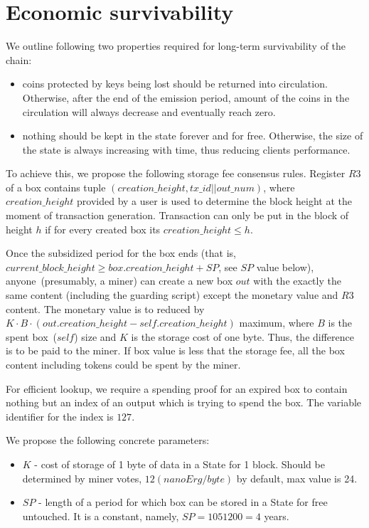\section{Economic survivability}

We outline following two properties required for long-term survivability of the chain:

\begin{itemize}
    \item{} coins protected by keys being lost should be returned into circulation.
    Otherwise, after the end of the emission period, amount of the coins
    in the circulation will always decrease and eventually reach zero.
    \item{} nothing should be kept in the state forever and for free.
    Otherwise, the size of the state is always increasing with time, thus reducing clients performance.
\end{itemize}

To achieve this, we propose the following storage fee consensus rules.
Register $R3$ of a box contains tuple $(creation\_height, tx\_id || out\_num)$, where $creation\_height$ provided by a user
is used to determine the block height at the moment of transaction generation.
Transaction can only be put in the block of height $h$ if for every created box its $creation\_height \le h$.

Once the subsidized period for the box ends (that is,
$current\_block\_height \ge box.creation\_height + SP$, see $SP$ value below), anyone~(presumably, a miner) can
create a new box $out$ with the exactly the same content (including the guarding
script) except the monetary value and $R3$ content. The monetary value is to
reduced by $K \cdot B \cdot (out.creation\_height - self.creation\_height)$ maximum, where $B$ is the spent box~($self$)
size and $K$ is the storage cost of one byte. Thus, the difference is to be paid to the miner.
If box value is less that the storage fee, all the box content including tokens could be spent by the miner.

For efficient lookup, we require a spending proof for an expired box to contain nothing but an index of an
output which is trying to spend the box. The variable identifier for the index is $127$.


We propose the following concrete parameters:
\begin{itemize}
    \item{} $K$ - cost of storage of 1 byte of data in a State for 1 block.
    Should be determined by miner votes, $12 (nanoErg/byte)$ by default, max value is 24.
    \item{} $SP$ - length of a period for which box can be stored in a State for free untouched.
    It is a constant, namely, $SP = 1051200 = 4$ years.
\end{itemize}

